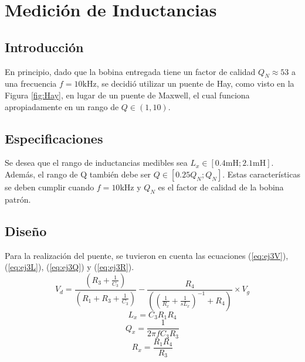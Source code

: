 \chapter{Medición de Inductancias}
    \section{Introducción}
    \label{sec:ej3Intro}
    \begin{figure}[h]
        \begin{center}
            
        \end{center}
        
    \end{figure}
    En principio, dado que la bobina entregada tiene un factor de calidad
    $Q_N\approx53$ a una frecuencia $f=10\si{\kilo\hertz}$, se decidió utilizar un
    puente de Hay, como visto en la Figura \ref{fig:Hay}, en lugar de un puente de
    Maxwell, el cual funciona apropiadamente en un rango de $Q\in(1,10)$.
    
    \section{Especificaciones}
    \label{sec:ej3Specs}
    Se desea que el rango de inductancias medibles sea $L_x\in[0.4\si{\milli\henry};
    2.1\si{\milli\henry}]$. Además, el rango de Q también debe ser $Q\in[0.25Q_N; Q_N]$.
    Estas características se deben cumplir cuando $f=10\si{\kilo\hertz}$ y $Q_N$ es
    el factor de calidad de la bobina patrón.
    
    \section{Diseño}
    \label{sec:ej3Design}
    Para la realización del puente, se tuvieron en cuenta las ecuaciones (\ref{eq:ej3V}),
    (\ref{eq:ej3L}), (\ref{eq:ej3Q}) y (\ref{eq:ej3R}).
    \begin{equation}
        V_d=\frac{(R_3 + \frac{1}{C_3})}{(R_1+R_3 + \frac{1}{C_3})} - \frac{R_4}{((\frac{1}{R_x}+\frac{1}{sL_x})^{-1}+R_4)} \times V_g
        \label{eq:ej3V}
    \end{equation}
    \begin{equation}
        L_x = C_3 R_1 R_4
        \label{eq:ej3L}
    \end{equation}
    \begin{equation}
        Q_x=\frac{1}{2 \pi f C_3 R_3}
        \label{eq:ej3Q}
    \end{equation}
    \begin{equation}
        R_x=\frac{R_1 R_4}{R_3}
        \label{eq:ej3R}
    \end{equation}

